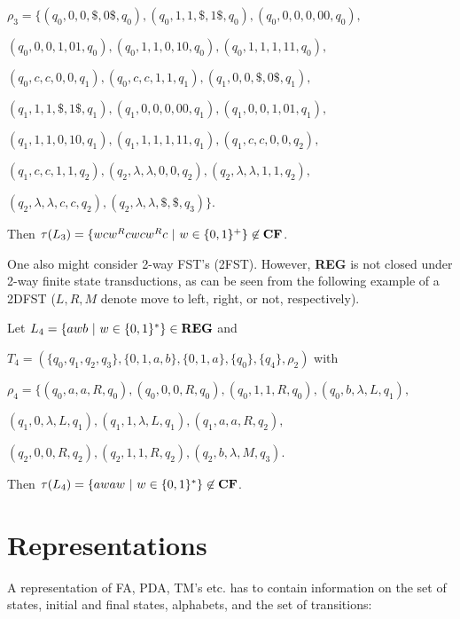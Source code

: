 \documentclass{eptcs}
\begin{document}
$\rho_3=\{(q_0,0,0,{\$},0{\$},q_0),(q_0,1,1,{\$},1{\$},q_0),(q_0,0,0,0,00,q_0),$

\hspace{1cm}$(q_0,0,0,1,01,q_0),(q_0,1,1,0,10,q_0),(q_0,1,1,1,11,q_0),$

\hspace{1cm}$(q_0,c,c,0,0,q_1),(q_0,c,c,1,1,q_1),(q_1,0,0,{\$},0{\$},q_1),$

\hspace{1cm}$(q_1,1,1,{\$},1{\$},q_1),(q_1,0,0,0,00,q_1),
(q_1,0,0,1,01,q_1),$

\hspace{1cm}$(q_1,1,1,0,10,q_1),(q_1,1,1,1,11,q_1),(q_1,c,c,0,0,q_2),$

\hspace{1cm}$(q_1,c,c,1,1,q_2),
(q_2,\lambda,\lambda,0,0,q_2),(q_2,\lambda,\lambda,1,1,q_2),$

\hspace{1cm}$(q_2,\lambda,\lambda,c,c,q_2),(q_2,\lambda,\lambda,{\$},{\$},q_3)\}$.

Then $\tau(L_3) = \{wcw^Rcwcw^Rc\ |\ w\in\{0,1\}^+\} \not\in {\bf CF}$.

\bigskip

One also might consider 2-way FST's (2FST). However, {\bf REG} is not closed
under 2-way finite state transductions, as can be seen from the following
example of a 2DFST ($L,R,M$ denote move to left, right, or not,
respectively).

\noindent
Let $L_4=\{awb\ |\ w\in\{0,1\}^*\}\in {\bf REG}$ and

$T_4=(\{q_0,q_1,q_2,q_3\},\{0,1,a,b\},\{0,1,a\},\{q_0\},\{q_4\},\rho_2)$
with

$\rho_4=\{(q_0,a,a,R,q_0),(q_0,0,0,R,q_0),(q_0,1,1,R,q_0),(q_0,b,\lambda,L,q_1),$

\hspace{1cm}$(q_1,0,\lambda,L,q_1),(q_1,1,\lambda,L,q_1),(q_1,a,a,R,q_2),$

\hspace{1cm}$(q_2,0,0,R,q_2),(q_2,1,1,R,q_2),(q_2,b,\lambda,M,q_3)$.

Then $\tau(L_4)=\{awaw\ |\ w\in\{0,1\}^*\}\not\in {\bf CF}$.

\bigskip


\section{Representations}

A representation of FA, PDA, TM's etc. has to contain information on the
set of states, initial and final states, alphabets, and the set of transitions:
\end{document}
